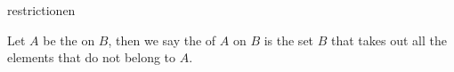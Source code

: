 \begin{modnl}[creator=hang]{restriction}{en}
	\begin{definition}[id=restriction.def]
	Let $A$ be the  on  $B$,
	then we say the  of $A$ on $B$ is the set $B$
	that takes out all the elements that do not belong to $A$.
	\end{definition}
\end{modnl}
